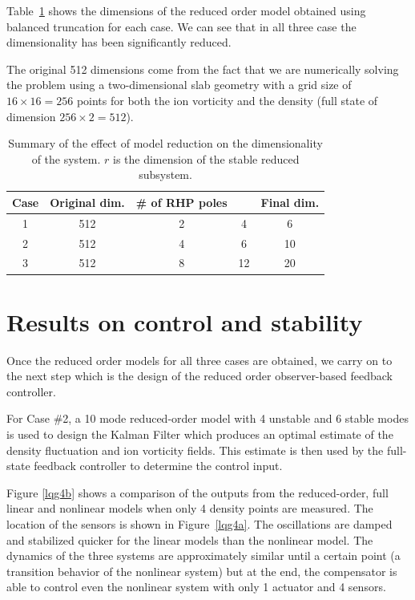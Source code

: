 \documentclass[12pt,lot, lof]{puthesis}
\begin{document}
Table~\ref{Tabreduced2} shows the dimensions of the reduced order model obtained using balanced truncation for each case. We can see that in all three case the dimensionality has been significantly reduced.

The original 512 dimensions come from the fact that we are numerically solving the problem using a two-dimensional slab geometry with a grid size of $16 \times 16 = 256$ points for both the ion vorticity and the density (full state of dimension $256 \times 2 = 512$).

\begin{table}[htbp]
	\centering
	\caption{Summary of the effect of model reduction on the dimensionality of the system.
		$r$ is the dimension of the stable reduced  subsystem.}
	\label{Tabreduced2}
	\begin{tabular}{ccccc} \\[-0.5em]
		Case & Original dim. & \# of RHP poles &  \makebox[2em]{$r$} & Final dim. \\ \hline
		1 & 512 & 2 &  4 &  6  \\
		2 & 512 & 4 &  6 & 10 \\  
		3 & 512 & 8 &12 & 20 \\
	\end{tabular}
\end{table}


\section{Results on control and stability}

Once the reduced order models for all three cases are obtained, we carry on to the next step which is the design of the reduced order observer-based feedback controller.

For Case \#2, a 10 mode reduced-order model with 4 unstable and 6 stable modes is used to design the Kalman Filter which produces an optimal estimate of the density fluctuation and ion vorticity fields. This estimate is then used by the full-state feedback controller to determine the control input.

Figure \ref{lqg4b} shows a comparison of the outputs from the reduced-order, full linear and nonlinear models when only 4 density points are measured.
The location of the sensors is shown in Figure~\ref{lqg4a}.
The oscillations are damped and stabilized quicker for the linear models than the nonlinear model. The dynamics of the three systems are approximately similar until a certain point (a transition behavior of the nonlinear system) but at the end, the compensator is able to control even the nonlinear system with only 1 actuator and 4 sensors.
\end{document}
